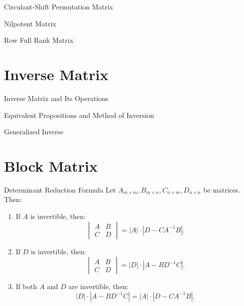 \documentclass[11pt]{../../TexTemplate/elegantbook} %
\begin{document}
\begin{leftbarTitle}{Circulant-Shift Permutation Matrix}\end{leftbarTitle}

\begin{leftbarTitle}{Nilpotent Matrix}\end{leftbarTitle}

\begin{leftbarTitle}{Row Full Rank Matrix}\end{leftbarTitle}

\section{Inverse Matrix}
\begin{leftbarTitle}{Inverse Matrix and Its Operations}\end{leftbarTitle}

\begin{leftbarTitle}{Equivalent Propositions and Method of Inversion}\end{leftbarTitle}

\begin{leftbarTitle}{Generalized Inverse}\end{leftbarTitle}

\section{Block Matrix}

\begin{theorem}{Determinant Reduction Formula}
    Let \(A_{m\times m}, B_{m\times n}, C_{n\times m}, D_{n\times n}\) be matrices. Then:
    \begin{enumerate}
        \item If \( A \) is invertible, then:
            \[
            \begin{vmatrix}
            A & B \\
            C & D
            \end{vmatrix}
            = |A| \cdot |D - CA^{-1}B|.
            \]
        \item If \( D \) is invertible, then:
            \[
            \begin{vmatrix}
            A & B \\
            C & D
            \end{vmatrix}
            = |D| \cdot |A - BD^{-1}C|.
            \]
        \item If both \( A \) and \( D \) are invertible, then:
            \[
            |D| \cdot |A - BD^{-1}C| = |A| \cdot |D - CA^{-1}B|.
            \]
    \end{enumerate}
\end{theorem}
\end{document}
